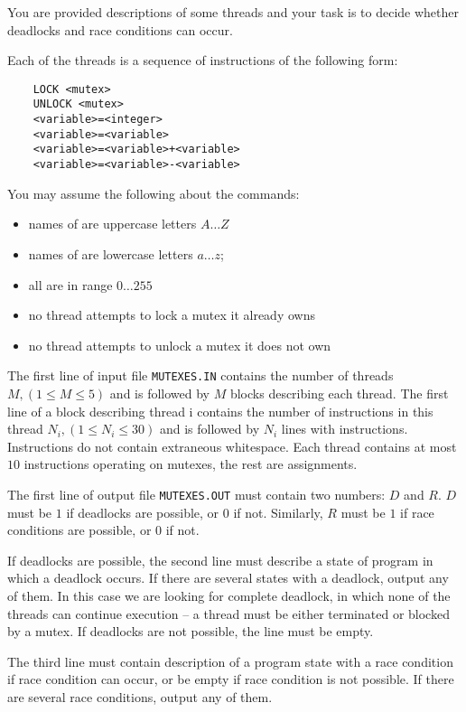 You are provided descriptions of some threads and your task is to decide whether
deadlocks and race conditions can occur.

Each of the threads is a sequence of instructions of the following form:
\begin{verbatim}
    LOCK <mutex>
    UNLOCK <mutex>
    <variable>=<integer>
    <variable>=<variable>
    <variable>=<variable>+<variable>
    <variable>=<variable>-<variable>
\end{verbatim}
You may assume the following about the commands:
\begin{itemize}
\item    names of  are uppercase letters $A\ldots Z$
\item    names of  are lowercase letters $a\ldots z$;
\item    all  are in range $0\ldots255$
\item    no thread attempts to lock a mutex it already owns
\item    no thread attempts to unlock a mutex it does not own
\end{itemize}

The first line of input file \verb|MUTEXES.IN| contains the number of threads
$M, (1 \leq M \leq 5)$ and is followed by $M$ blocks describing each thread. The first
line of a block describing thread i contains the number of instructions in this thread
$N_i, (1\leq N_i \leq 30)$ and is
followed by $N_i$ lines with instructions. Instructions do not contain extraneous
whitespace. Each thread contains at most $10$ instructions operating on mutexes, the rest
are assignments.

The first line of output file \verb|MUTEXES.OUT| must contain two numbers:
$D$ and $R$. $D$ must be $1$
if deadlocks are possible, or $0$ if not. Similarly, $R$ must be $1$ if race conditions are
possible, or $0$ if not.

If deadlocks are possible, the second line must describe a state of program in which a
deadlock occurs. If there are several states with a deadlock, output any of them. In
this case we are looking for complete deadlock, in which none of the threads can
continue execution -- a thread must be either terminated or blocked by a mutex. If
deadlocks are not possible, the line must be empty.

The third line must contain description of a program state with a race condition if
race condition can occur, or be empty if race condition is not possible. If there
are several race conditions, output any of them.

